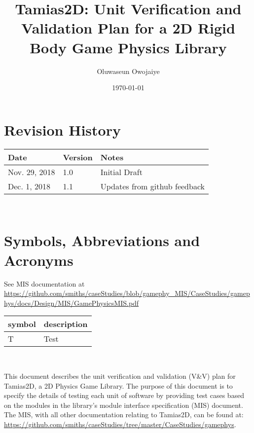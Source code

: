 \documentclass[12pt, titlepage]{article}
\newcommand{\progname}{Tamias2D}
\begin{document}
\title{Tamias2D: Unit Verification and Validation Plan for a 2D Rigid Body Game Physics Library} 
\author{Oluwaseun Owojaiye}
\date{\today}
	
\maketitle


\section{Revision History}

\begin{tabularx}{\textwidth}{p{3cm}p{2cm}X}
\toprule {\bf Date} & {\bf Version} & {\bf Notes}\\
\midrule
Nov. 29, 2018 & 1.0 & Initial Draft\\
Dec. 1, 2018 & 1.1 & Updates from github feedback\\
\bottomrule
\end{tabularx}

~\newpage

\section{Symbols, Abbreviations and Acronyms}
See MIS documentation at \url{https://github.com/smiths/caseStudies/blob/gamephy_MIS/CaseStudies/gamephys/docs/Design/MIS/GamePhysicsMIS.pdf} \\
\renewcommand{\arraystretch}{1.2}
\begin{tabular}{l l} 
  \toprule		
  \textbf{symbol} & \textbf{description}\\
  \midrule 
  T & Test\\
  \bottomrule
\end{tabular}\\


\newpage

\tableofcontents

\listoftables

\listoffigures

\newpage


This document describes the unit verification and validation (V\&V) plan for \progname, a 2D Physics Game Library. The purpose of this document is to specify the details of testing each unit of software by providing test cases based on the modules in the library's module interface specification (MIS) document. The MIS, with all other documentation relating to \progname{}, can be found at: \url{https://github.com/smiths/caseStudies/tree/master/CaseStudies/gamephys}.
\end{document}
